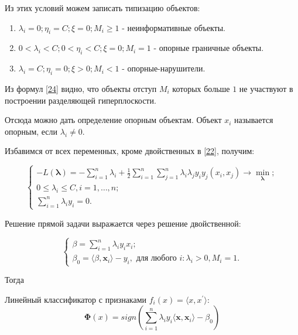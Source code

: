 \documentclass[11pt, oneside]{article}   	%
\begin{document}
Из этих условий можем записать типизацию объектов:

\begin{enumerate}
	\item $ \lambda_i = 0; \eta_i = C; \xi = 0; M_i \geqslant 1 $ - неинформативные объекты.
	\item $ 0 < \lambda_i < C; 0 < \eta_i < C; \xi = 0; M_i = 1 $ - опорные граничные объекты.
	\item $ \lambda_i = C; \eta_i = 0; \xi > 0; M_i < 1 $ - опорные-нарушители.
\end{enumerate}

Из формул \ref{24} видно, что объекты отступ $M_i$ которых больше $1$ не участвуют в построении разделяющей гиперплоскости. 

Отсюда можно дать определение опорным объектам. Объект $x_i$ называется опорным, если $\lambda_i \neq 0$.

Избавимся от всех переменных, кроме двойственных в \ref{22}, получим:

\begin{equation}
	\begin{cases}
		-L(\bm{\lambda}) = - \sum\limits_{i=1}^n \lambda_i + \frac{1}{2} \sum\limits_{i=1}^{n}\sum\limits_{j=1}^{n} \lambda_i \lambda_j y_i y_j (x_i, x_j) \rightarrow \min\limits_{\bm{\lambda}}; \\
		0 \leqslant \lambda_i \leqslant C, i = 1, \dotsc, n; \\
		\sum\limits_{i=1}^{n} \lambda_i y_i = 0.
	\end{cases}
	\label{25}
\end{equation}

Решение прямой задачи выражается через решение двойственной:

\begin{equation}
	\begin{cases}
		\beta = \sum\limits_{i=1}^n \lambda_i y_i x_i;\\
		\beta_0 = \langle\beta, \bm{x}_i\rangle - y_i, \text{ для любого } i: \lambda_i > 0, M_i = 1.
	\end{cases}
	\label{26}
\end{equation}

Тогда 

Линейный классификатор с признаками $f_i(x) = \langle x, x^{'} \rangle $: 
\begin{equation} 
	\bm{\Phi}(x) = sign ( \sum\limits_{i=1}^{n} \lambda_i y_i \langle\bm{x}, \bm{x}_i\rangle - \beta_0) 
	\label{27}
\end{equation}
\end{document}

